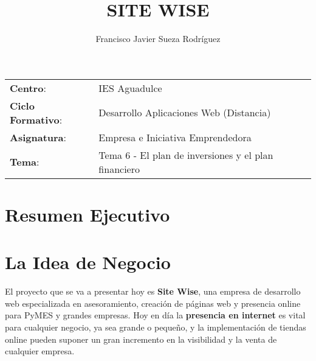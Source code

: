 


\title{
\vspace{10ex}
\normalfont \normalsize
\Huge  \textbf{SITE WISE}
}
\author{Francisco Javier Sueza Rodríguez}



\maketitle

\thispagestyle{empty}


\vspace{73ex}

\begin{center}
    \begin{tabular}{l l}
        \textbf{Centro}: & IES Aguadulce \\
        \textbf{Ciclo Formativo}: & Desarrollo Aplicaciones Web (Distancia)\\
        \textbf{Asignatura}: & Empresa e Iniciativa Emprendedora\\
        \textbf{Tema}: & Tema 6 - El plan de inversiones y el plan financiero\\
    \end{tabular}
\end{center}

\newpage

\tableofcontents

\newpage

\section{Resumen Ejecutivo}

\section{La Idea de Negocio}
El proyecto que se va a presentar hoy es \textbf{Site Wise}, una empresa de desarrollo web especializada en asesoramiento, creación de páginas web y presencia online para PyMES y grandes empresas. Hoy en día la \textbf{presencia en internet} es vital para cualquier negocio, ya sea grande o pequeño, y la implementación de tiendas online pueden suponer un gran incremento en la visibilidad y la venta de cualquier empresa.

